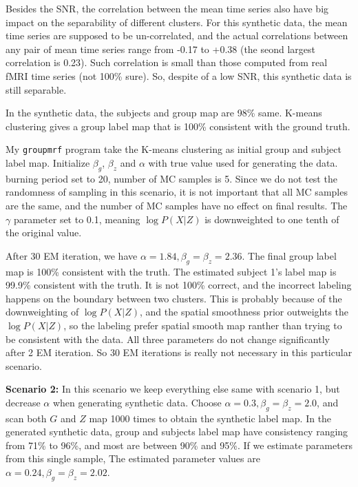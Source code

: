 \documentclass{article}
\begin{document}
Besides the SNR, the correlation between the mean time series also have big impact on the separability of different clusters. For this synthetic data,  the mean time series are supposed to be un-correlated, and the actual correlations between any pair of mean time series range from -0.17 to +0.38 (the seond largest correlation is 0.23).  Such correlation is small than those computed from real fMRI time series (not 100\% sure). So, despite of a low SNR, this synthetic data is still separable.

In the synthetic data, the subjects and group map are 98\% same. K-means clustering gives a group label map that is 100\% consistent with the ground truth.

My \texttt{groupmrf} program take the K-means clustering as initial group and subject label map. Initialize $\beta_g$, $\beta_z$ and $\alpha$ with true value used for generating the data. burning period set to 20, number of MC samples is 5.  Since we do not test the randomness of sampling in this scenario, it is not important that all MC samples are the same, and the number of MC samples have no effect on final results. The $\gamma$ parameter set to 0.1, meaning $\log P(X|Z)$ is downweighted to one tenth of the original value.

After 30 EM iteration, we have $\alpha = 1.84, \beta_g = \beta_z = 2.36$. The final group label map is 100\% consistent with the truth. The estimated subject 1's label map is 99.9\% consistent with the truth. It is not 100\% correct, and the incorrect labeling happens on the boundary between two clusters. This is probably because of the downweighting of $\log P(X|Z)$, and the spatial smoothness prior outweights the $\log P(X|Z)$, so the labeling prefer spatial smooth map ranther than trying to be consistent with the data.  All three parameters do not change significantly after 2 EM iteration. So 30 EM iterations is really not necessary in this particular scenario.


\textbf{Scenario 2: } In this scenario we keep everything else same with scenario 1, but decrease $\alpha$ when generating synthetic data. Choose $\alpha = 0.3, \beta_g = \beta_z = 2.0$, and scan both $G$ and $Z$ map 1000 times to obtain the synthetic label map. In the generated synthetic data, group and subjects label map have consistency ranging from 71\% to 96\%, and most are between 90\% and 95\%. If we estimate parameters from this single sample, The estimated parameter values are $\alpha = 0.24, \beta_g = \beta_z = 2.02$. 
\end{document}
